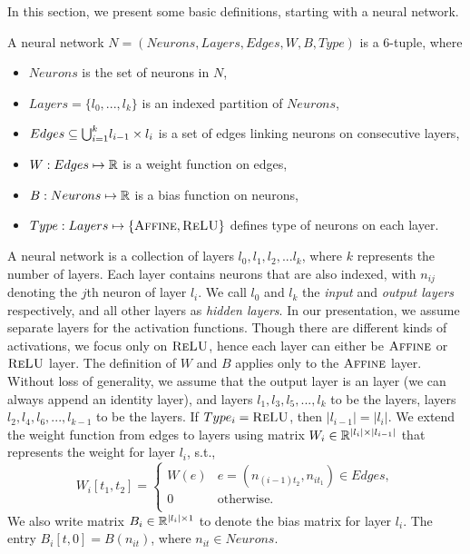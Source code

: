 In this section, we present some basic definitions, starting with a neural network. %

\begin{df}
  \label{def:net}
    A neural network $N = (Neurons, Layers, Edges, W, B, Type)$ is a 6-tuple, where
    \begin{itemize}
        \item $Neurons$ is the set of neurons in $N$,
        \item $Layers = \{l_0,...,l_k\}$ is an indexed partition of $Neurons$,
        \item $ Edges \subseteq {\bigcup}_{i=1}^{k} l_{i-1} \times l_{i}$ is a set of edges linking neurons on consecutive layers,
        \item $W : Edges \mapsto \mathbb{R}$ is a weight function on edges,
        \item $B : Neurons \mapsto \mathbb{R}$ is a bias function on neurons,
        \item $Type : Layers \mapsto \{\textsc{Affine}{}, \textsc{ReLU}{}\}$ defines type of neurons on each layer.
    \end{itemize}
\end{df}

A neural network is a collection of layers $l_0, l_1, l_2, ... l_k$, where $k$ represents the number of layers. Each layer contains neurons that are also indexed, with $n_{ij}$ denoting the $j$th neuron of layer $l_i$. We call $l_0$ and $l_k$ the {\em input} and {\em output layers} respectively, and all other layers as {\em hidden layers}. In our presentation, we assume separate layers for the activation functions. Though there are different kinds of activations, we focus only on $\textsc{ReLU}${}, hence each layer can either be  $\textsc{Affine}${} or $\textsc{ReLU}${} layer. The definition of $W$ and $B$ applies only to the $\textsc{Affine}${} layer. Without loss of generality, we assume that the output layer is an \affine{} layer (we can always append an identity \affine{} layer), and layers $l_1, l_3, l_5, ..., l_k$ to be the \affine{} layers, layers $l_2, l_4, l_6, ..., l_{k-1}$ to be the \relu{} layers. If $Type_i = \textsc{ReLU}{}$, then $|l_{i-1}| = |l_{i}|$. We extend the weight function from edges to layers using matrix $W_i \in \mathbb{R}^{|l_i|\times|l_{i-1}|}$ that represents the weight for layer $l_i$, s.t.,
$$
W_i[t_1, t_2] = 
\begin{cases}
  W(e) & e=(n_{(i-1)t_2}, n_{it_1}) \in Edges,\\
  0 & \text{otherwise.}\\
\end{cases}
$$
We also write matrix $B_i \in \mathbb{R}^{|l_i|\times 1}$ to denote the bias matrix for layer $l_i$. The entry $B_i[t,0] = B(n_{it})$, where $n_{it} \in Neurons$. 

